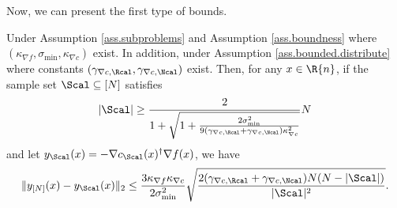 Now, we can present the first type of bounds.
\begin{lemma}
\label{lemma.bound.y.y_p}
Under Assumption \ref{ass.subproblems} and Assumption \ref{ass.boundness} where $(\kappa_{\nabla f}, \sigma_{\min},\kappa_{\nabla c})$ exist. In addition, under Assumption \ref{ass.bounded.distribute} where constants $(\gamma_{\nabla c, \Rcal},\gamma_{\nabla c, \Ncal})$ exist. Then, for any $x\in\R{n}$, if the sample set $\Scal\subseteq[N]$ satisfies 
\[
|\Scal|\ge\frac{2}{1+\sqrt{1+\frac{2\sigma_{\min}^2}{9(\gamma_{\nabla c, \Rcal}+\gamma_{\nabla c, \Ncal})\kappa_{\nabla c}^2}}}N 
\]
and let $y_\Scal(x)=-\nabla c_\Scal(x)^\dag\nabla f(x)$, we have
 	\[
 	\|y_{[N]}(x)-y_\Scal(x)\|_2\le \frac{3\kappa_{\nabla f}\kappa_{\nabla c}}{2\sigma_{\min}^2}\sqrt{ \frac{2(\gamma_{\nabla c, \Rcal}+\gamma_{\nabla c, \Ncal})N(N-|\Scal|)}{|\Scal|^2}}.
 	\]
 \end{lemma}
 
